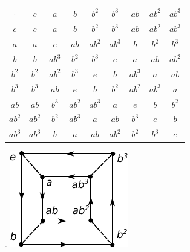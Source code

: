 \documentclass[twoside]{amsart}
\begin{document}
\begin{enumerate}[A.]
    \begin{center}
    \begin{tabular}{c|cccccccc}
    $\cdot$ & $e$ & $a$ & $b$ & $b^2$ & $b^3$ & $ab$ & $ab^2$ & $ab^3$ \\\hline

    $e$ & $e$ & $a$ & $b$ & $b^2$ & $b^3$ & $ab$ & $ab^2$ & $ab^3$ \\

    $a$ & $a$ & $e$ & $ab$ & $ab^2$ & $ab^3$ & $b$ & $b^2$ & $b^3$ \\

    $b$ & $b$ & $ab^3$ & $b^2$ & $b^3$ & $e$ & $a$ & $ab$ & $ab^2$ \\

    $b^2$ & $b^2$ & $ab^2$ & $b^3$ & $e$ & $b$ & $ab^3$ & $a$ & $ab$ \\

    $b^3$ & $b^3$ & $ab$ & $e$ & $b$ & $b^2$ & $ab^2$ & $ab^3$ & $a$ \\

    $ab$ & $ab$ & $b^3$ & $ab^2$ & $ab^3$ & $a$ & $e$ & $b$ & $b^2$ \\

    $ab^2$ & $ab^2$ & $b^2$ & $ab^3$ & $a$ & $ab$ & $b^3$ & $e$ & $b$ \\

    $ab^3$ & $ab^3$ & $b$ & $a$ & $ab$ & $ab^2$ & $b^2$ & $b^3$ & $e$
    \end{tabular}
    \end{center}

    . \includegraphics{img/chap5g5.pdf}


\end{enumerate}
\end{document}
